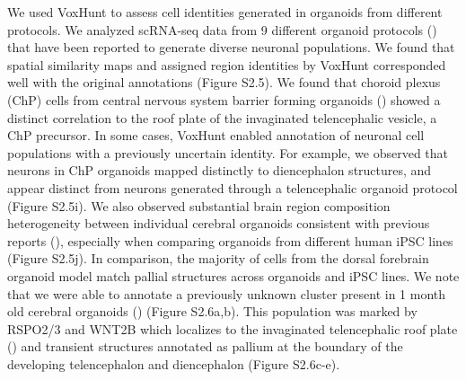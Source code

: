 We used VoxHunt to assess cell identities generated in organoids from different protocols. We analyzed scRNA-seq data from 9 different organoid protocols (\cite{bhaduri_cell_2020,birey_assembly_2017,giandomenico_cerebral_2019,kanton_organoid_2019,pellegrini_human_2020,pollen_establishing_2019,velasco_individual_2019,xiang_hesc-derived_2019}) that have been reported to generate diverse neuronal populations. We found that spatial similarity maps and assigned region identities by VoxHunt corresponded well with the original annotations (Figure S2.5). We found that choroid plexus (ChP) cells from central nervous system barrier forming organoids (\cite{pellegrini_human_2020}) showed a distinct correlation to the roof plate of the invaginated telencephalic vesicle, a ChP precursor. In some cases, VoxHunt enabled annotation of neuronal cell populations with a previously uncertain identity. For example, we observed that neurons in ChP organoids mapped distinctly to diencephalon structures, and appear distinct from neurons generated through a telencephalic organoid protocol (Figure S2.5i). We also observed substantial brain region composition heterogeneity between individual cerebral organoids consistent with previous reports (\cite{kanton_organoid_2019}), especially when comparing organoids from different human iPSC lines (Figure S2.5j). In comparison, the majority of cells from the dorsal forebrain organoid model match pallial structures across organoids and iPSC lines. We note that we were able to annotate a previously unknown cluster present in 1 month old cerebral organoids (\cite{camp_human_2015}) (Figure S2.6a,b). This population was marked by RSPO2/3 and WNT2B which localizes to the invaginated telencephalic roof plate (\cite{kamata_r-spondin_2004}) and transient structures annotated as pallium at the boundary of the developing telencephalon and diencephalon (Figure S2.6c-e). 

